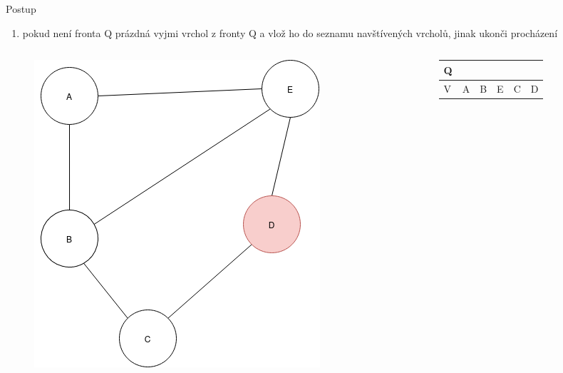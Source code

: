 \documentclass[hyperref={unicode}]{beamer}
\begin{document}
\begin{frame}
\begin{block}{Postup}
\begin{enumerate}
  [default]
    \item pokud není fronta Q prázdná vyjmi vrchol z fronty Q a vlož ho do seznamu navštívených vrcholů, jinak ukonči procházení
\end{enumerate}
\end{block}
  \begin{columns}[T]
    \begin{column}{0.3\linewidth}
        \begin{figure}
        \includegraphics[width=\linewidth]{state8.png}
        \end{figure}
    \end{column}
    \begin{column}{0.4\linewidth}
    \begin{table}[]
        \begin{tabular}{|l||l|l|l|l|l|}
        \hline
        Q &   &   &   &   &   \\ \hline
        V & A & B & E & C & D \\ \hline
        \end{tabular}
\end{table}
    \end{column}
  \end{columns}
\end{frame}
\end{document}
